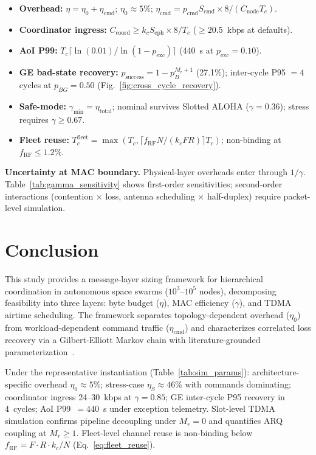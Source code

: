 \documentclass[journal]{IEEEtran}
\begin{document}
\begin{itemize}
\item \textbf{Overhead:} $\eta = \eta_0 + \eta_{\text{cmd}}$; $\eta_0 \approx 5\%$; $\eta_{\text{cmd}} = p_{\text{cmd}} S_{\text{cmd}} \times 8 / (C_{\text{node}} T_c)$.
\item \textbf{Coordinator ingress:} $C_{\text{coord}} \geq k_c S_{\text{eph}} \times 8 / T_c$ ($\geq 20.5$~kbps at defaults).
\item \textbf{AoI P99:} $T_c \lceil \ln(0.01) / \ln(1 - p_{\text{exc}}) \rceil$ (440~s at $p_{\text{exc}} = 0.10$).
\item \textbf{GE bad-state recovery:} $p_{\text{success}} = 1 - p_B^{M_r+1}$ (27.1\%); inter-cycle P95 $= 4$ cycles at $p_{BG} = 0.50$ (Fig.~\ref{fig:cross_cycle_recovery}).
\item \textbf{Safe-mode:} $\gamma_{\min} = \eta_{\text{total}}$; nominal survives Slotted ALOHA ($\gamma = 0.36$); stress requires $\gamma \geq 0.67$.
\item \textbf{Fleet reuse:} $T_c^{\text{fleet}} = \max(T_c, \lceil f_{\text{RF}} N / (k_c F R) \rceil T_c)$; non-binding at $f_{\text{RF}} \leq 1.2\%$.
\end{itemize}

\textbf{Uncertainty at MAC boundary.} Physical-layer overheads enter through $1/\gamma$. Table~\ref{tab:gamma_sensitivity} shows first-order sensitivities; second-order interactions (contention $\times$ loss, antenna scheduling $\times$ half-duplex) require packet-level simulation.

\section{Conclusion}

This study provides a message-layer sizing framework for hierarchical coordination in autonomous space swarms ($10^3$--$10^5$ nodes), decomposing feasibility into three layers: byte budget ($\eta$), MAC efficiency ($\gamma$), and TDMA airtime scheduling. The framework separates topology-dependent overhead ($\eta_0$) from workload-dependent command traffic ($\eta_{\text{cmd}}$) and characterizes correlated loss recovery via a Gilbert-Elliott Markov chain with literature-grounded parameterization~\cite{lutz_1991}.

Under the representative instantiation (Table~\ref{tab:sim_params}): architecture-specific overhead $\eta_0 \approx 5\%$; stress-case $\eta_S \approx 46\%$ with commands dominating; coordinator ingress 24--30~kbps at $\gamma = 0.85$; GE inter-cycle P95 recovery in 4~cycles; AoI P99~$= 440$~s under exception telemetry. Slot-level TDMA simulation confirms pipeline decoupling under $M_r = 0$ and quantifies ARQ coupling at $M_r \geq 1$. Fleet-level channel reuse is non-binding below $f_{\text{RF}} = F \cdot R \cdot k_c / N$ (Eq.~\ref{eq:fleet_reuse}).
\end{document}
